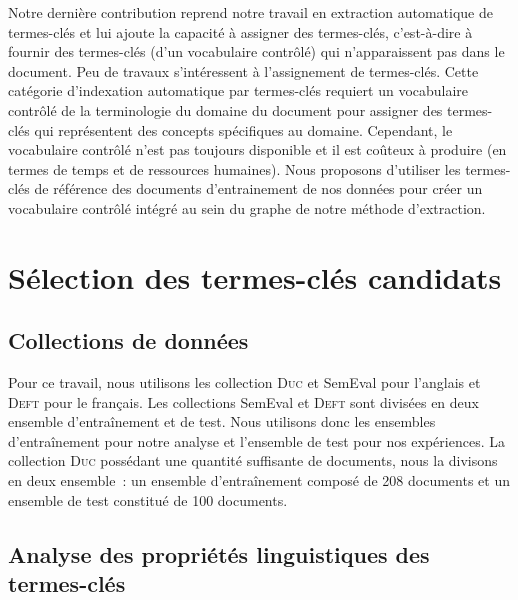     Notre dernière contribution reprend notre travail en extraction automatique
    de termes-clés et lui ajoute la capacité à assigner des termes-clés,
    c'est-à-dire à fournir des termes-clés (d'un vocabulaire contrôlé) qui
    n'apparaissent pas dans le document. Peu de travaux s'intéressent à
    l'assignement de termes-clés. Cette catégorie d'indexation automatique par
    termes-clés requiert un vocabulaire contrôlé de la terminologie du domaine
    du document pour assigner des termes-clés qui représentent des concepts
    spécifiques au domaine. Cependant, le vocabulaire contrôlé n'est pas
    toujours disponible et il est coûteux à produire (en termes de temps et de
    ressources humaines). Nous proposons d'utiliser les termes-clés de référence
    des documents d'entrainement de nos données pour créer un vocabulaire
    contrôlé intégré au sein du graphe de notre méthode d'extraction.


  \section{Sélection des termes-clés candidats}
  \label{sec:main-automatic_keyphrase_annotation-keyphrase_candidate_selection}

    \subsection{Collections de données}
    \label{subsec:main-automatic_keyphrase_annotation-keyphrase_candidate_selection-datasets}
      Pour ce travail, nous utilisons les collection \textsc{Duc} et SemEval
      pour l'anglais et \textsc{Deft} pour le français. Les collections SemEval
      et \textsc{Deft} sont divisées en deux ensemble d'entraînement et de test.
      Nous utilisons donc les ensembles d'entraînement pour notre analyse et
      l'ensemble de test pour nos expériences. La collection \textsc{Duc}
      possédant une quantité suffisante de documents, nous la divisons en deux
      ensemble~: un ensemble d'entraînement composé de 208 documents et un
      ensemble de test constitué de 100 documents.

    \subsection{Analyse des propriétés linguistiques des termes-clés}
    \label{subsec:main-automatic_keyphrase_annotation-keyphrase_candidate_selection-analysis_of_keyphrase_properties}

